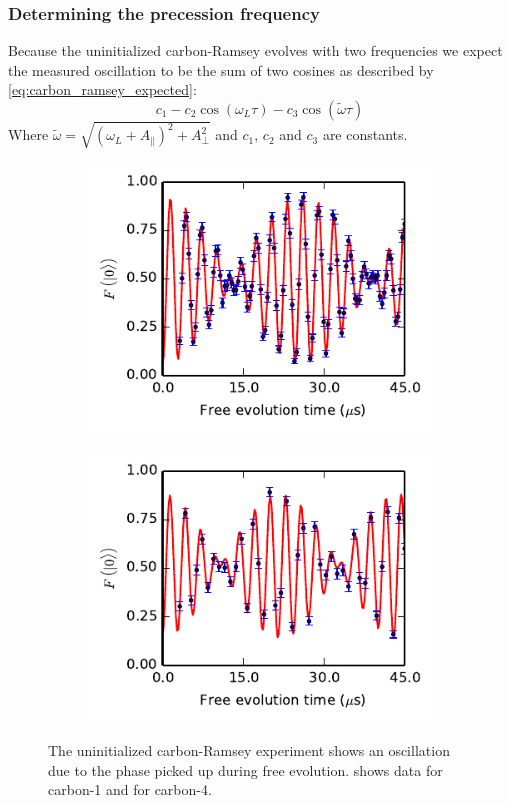 \subsubsection{Determining the precession frequency}
Because the uninitialized carbon-Ramsey evolves with two frequencies we expect the measured oscillation to be the sum of two cosines as described by \cref{eq:carbon_ramsey_expected}:
\begin{equation}
    c_1 - c_2 \cos(\omega_L \tau ) -c_3  \cos (\tilde{\omega} \tau )
    \label{eq:carbon_ramsey_expected}
\end{equation}
Where $ \tilde\omega =   \sqrt{(\omega_L+A_\parallel) ^2 + A_\perp^2} $ and $c_1$, $c_2$ and $c_3$ are constants.


\begin{figure}[htbp]
    \begin{subfigure}[t]{0.49\textwidth}\centering
        \caption{}
        \includegraphics{Img/CarbonRamsey_C1.pdf}
        \label{fig:CR_C1}
    \end{subfigure}
    \begin{subfigure}[t]{0.49\textwidth}\centering
        \caption{}
        \includegraphics{Img/CarbonRamsey_C4.pdf}
        \label{fig:CR_C4}
    \end{subfigure}
    \caption{The uninitialized carbon-Ramsey experiment shows an oscillation due to the phase picked up during free evolution.
     shows data for carbon-1 and  for carbon-4.}
    \label{fig:Uninitialized_carbon_ramsey}
\end{figure}

